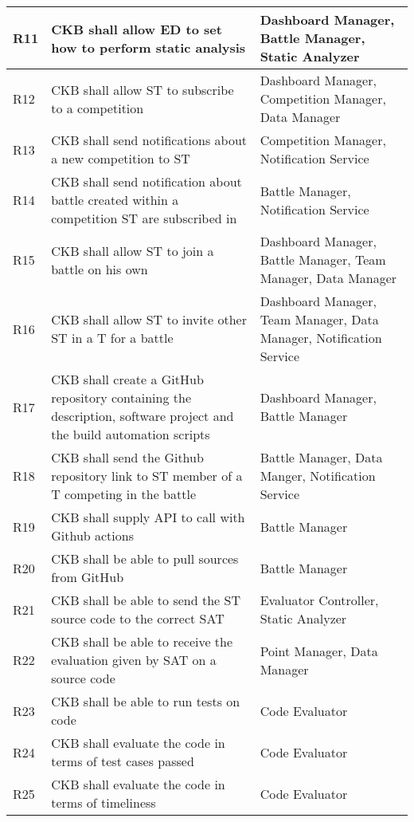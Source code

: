 \begin{center}
\begin{longtable}{|p{0.05\linewidth}|p{0.55\linewidth}|p{0.4\linewidth}|}
        \hline
        R11 & CKB shall allow ED to set how to perform static analysis &  Dashboard Manager, Battle Manager, Static Analyzer\\
        \hline
        R12 & CKB shall allow ST to subscribe to a competition &  Dashboard Manager, Competition Manager, Data Manager\\
        \hline
        R13 & CKB shall send notifications about a new competition to ST & Competition Manager, Notification Service \\
        \hline
        R14 & CKB shall send notification about battle created within a competition ST are subscribed in & Battle Manager, Notification Service \\
        \hline
        R15 & CKB shall allow ST to join a battle on his own &  Dashboard Manager, Battle Manager, Team Manager, Data Manager\\
        \hline
        R16 & CKB shall allow ST to invite other ST in a T for a battle &  Dashboard Manager, Team Manager, Data Manager, Notification Service \\
        \hline
        R17 & CKB shall create a GitHub repository containing the description, software project and the build automation scripts & Dashboard Manager, Battle Manager\\
        \hline
        R18 & CKB shall send the Github repository link to ST member of a T competing in the battle & Battle Manager, Data Manger, Notification Service\\
        \hline
        R19 & CKB shall supply API to call with Github actions & Battle Manager \\
        \hline
        R20 & CKB shall be able to pull sources from GitHub & Battle Manager \\
        \hline
        R21 & CKB shall be able to send the ST source code to the correct SAT  & Evaluator Controller, Static Analyzer\\
        \hline
        R22 & CKB shall be able to receive the evaluation given by SAT on a source code & Point Manager, Data Manager\\
        \hline
        R23 & CKB shall be able to run tests on code & Code Evaluator \\
        \hline
        R24 & CKB shall evaluate the code in terms of test cases passed & Code Evaluator\\
        \hline
        R25 & CKB shall evaluate the code in terms of timeliness & Code Evaluator\\
        \hline

\end{longtable}
\end{center}
